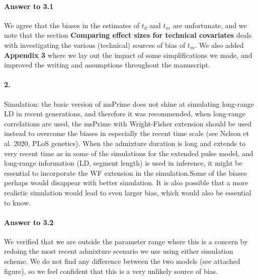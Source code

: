 \documentclass[11pt]{article}
\let\oldparagraph\paragraph
\renewcommand{\paragraph}[1]{\oldparagraph{#1}\mbox{}}
\begin{document}
\paragraph{Answer to 3.1}
We agree that the biases in the estimates of $t_d$ and $t_m$ are unfortunate, and we note that the section \textbf{Comparing effect sizes for technical covariates} deals with investigating the various (technical) sources of bias of $t_m$. We also added \textbf{Appendix 3} where we lay out the impact of some simplifications we made, and improved the writing and assumptions throughout the manuscript.

\paragraph{2.}
Simulation: the basic version of msPrime does not shine at simulating long-range LD in recent generations, and therefore it was recommended, when long-range correlations are used, the msPrime with Wright-Fisher extension should be used instead to overcome the biases in especially the recent time scale (see Nelson et al. 2020, PLoS genetics). When the admixture duration is long and extends to very recent time as in some of the simulations for the extended pulse model, and long-range information (LD, segment length) is used in inference, it might be essential to incorporate the WF extension in the simulation.Some of the biases perhaps would disappear with better simulation. It is also possible that a more realistic simulation would lead to even larger bias, which would also be essential to know.

\paragraph{Answer to 3.2}
We verified that we are outside the parameter range where this is a concern by redoing the most recent admixture scenario we use using either simulation scheme. We do not find any difference between the two models (see attached figure), so we feel confident that this is a very unlikely source of bias. 
\end{document}
